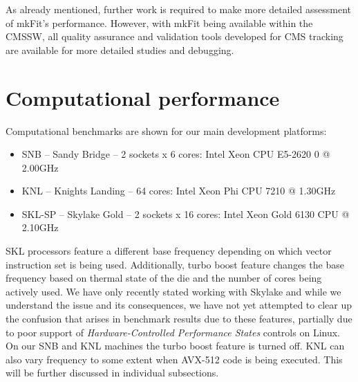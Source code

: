 \documentclass{webofc}
\def\mkfit{mkFit\xspace}
\begin{document}

As already mentioned, further work is required to make more detailed
assessment of \mkfit's performance. However, with \mkfit being available
within the CMSSW, all quality assurance and validation tools developed for CMS
tracking are available for more detailed studies and debugging.



\section{Computational performance}
\label{sec:comp-perf}


Computational benchmarks are shown for our main development platforms:

\begin{itemize}

\item SNB -- Sandy Bridge -- 2 sockets x 6 cores: Intel Xeon CPU E5-2620 0 @ 2.00GHz

\item KNL -- Knights Landing -- 64 cores: Intel Xeon Phi CPU 7210 @ 1.30GHz

\item SKL-SP -- Skylake Gold -- 2 sockets x 16 cores: Intel Xeon Gold 6130 CPU @ 2.10GHz

\end{itemize}

SKL processors feature a different base frequency depending on which vector
instruction set is being used. Additionally, turbo boost feature changes the
base frequency based on thermal state of the die and the number of cores being
actively used. We have only recently stated working with Skylake and while we
understand the issue and its consequences, we have not yet attempted to clear
up the confusion that arises in benchmark results due to these features,
partially due to poor support of \emph{Hardware-Controlled Performance States}
controls on Linux. On our SNB and KNL machines the turbo boost feature is
turned off. KNL can also vary frequency to some extent when AVX-512 code is
being executed. This will be further discussed in individual subsections.
\end{document}
